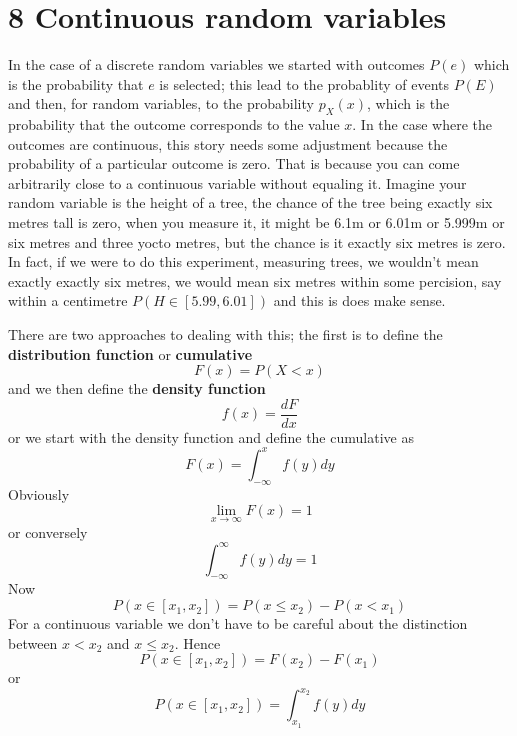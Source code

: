 \documentclass[11pt,a4paper]{scrartcl}
\begin{document}
\section*{8 Continuous random variables}

In the case of a discrete random variables we started with outcomes
$P(e)$ which is the probability that $e$ is selected; this lead to the
probablity of events $P(E)$ and then, for random variables, to the
probability $p_X(x)$, which is the probability that the outcome
corresponds to the value $x$. In the case where the outcomes are
continuous, this story needs some adjustment because the probability
of a particular outcome is zero. That is because you can come
arbitrarily close to a continuous variable without equaling
it. Imagine your random variable is the height of a tree, the chance
of the tree being exactly six metres tall is zero, when you measure
it, it might be 6.1m or 6.01m or 5.999m or six metres and three yocto
metres, but the chance is it exactly six metres is zero. In fact, if
we were to do this experiment, measuring trees, we wouldn't mean
exactly exactly six metres, we would mean six metres within some
percision, say within a centimetre $P(H\in [5.99,6.01])$ and this is
does make sense.

There are two approaches to dealing with this; the first is to define
the \textbf{distribution function} or \textbf{cumulative}
\begin{equation}
F(x)=P(X<x)
\end{equation}
and we then define the \textbf{density function}
\begin{equation}
f(x)=\frac{dF}{dx}
\end{equation}
or we start with the density function and define the cumulative as
\begin{equation}
F(x)=\int_{-\infty}^x f(y)dy
\end{equation}
Obviously 
\begin{equation}
\lim_{x\rightarrow \infty}F(x)=1
\end{equation}
or conversely 
\begin{equation}
\int_{-\infty}^\infty f(y)dy=1
\end{equation}
Now
\begin{equation}
P(x\in [x_1,x_2])=P(x\le x_2)-P(x<x_1)
\end{equation}
For a continuous variable we don't have to be careful about the
distinction between $x<x_2$ and $x\le x_2$. Hence
\begin{equation}
P(x\in [x_1,x_2])=F(x_2)-F(x_1)
\end{equation}
or
\begin{equation}
P(x\in [x_1,x_2])=\int_{x_1}^{x_2} f(y)dy
\end{equation}
\end{document}
